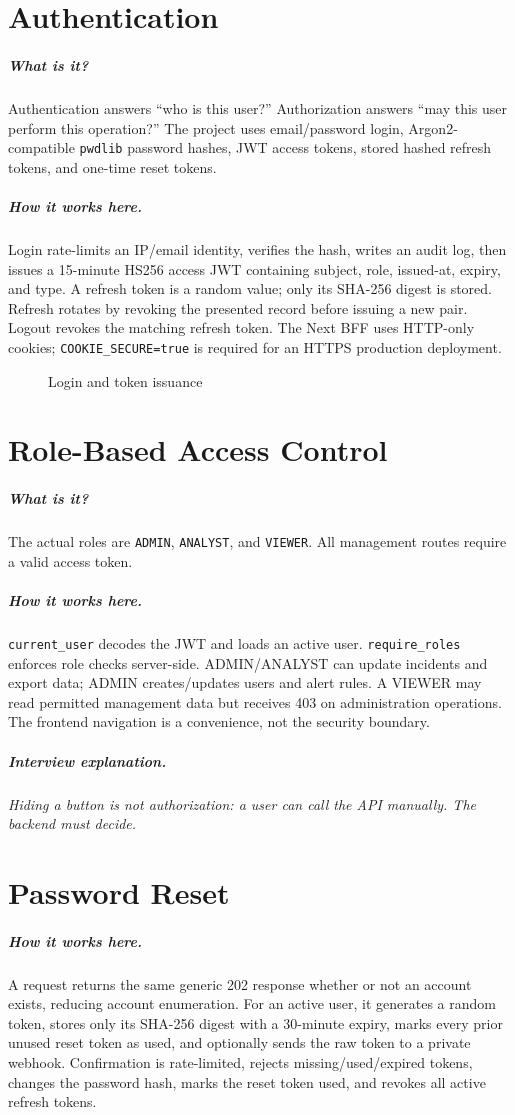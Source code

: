 \documentclass[11pt,oneside]{book}
\newcommand{\what}[1]{\paragraph{What is it?}#1}
\newcommand{\how}[1]{\paragraph{How it works here.}#1}
\newcommand{\interview}[1]{\paragraph{Interview explanation.}\emph{#1}}
\begin{document}
\chapter{Authentication}
\what{Authentication answers ``who is this user?'' Authorization answers ``may this user perform this operation?'' The project uses email/password login, Argon2-compatible \texttt{pwdlib} password hashes, JWT access tokens, stored hashed refresh tokens, and one-time reset tokens.}
\how{Login rate-limits an IP/email identity, verifies the hash, writes an audit log, then issues a 15-minute HS256 access JWT containing subject, role, issued-at, expiry, and type. A refresh token is a random value; only its SHA-256 digest is stored. Refresh rotates by revoking the presented record before issuing a new pair. Logout revokes the matching refresh token. The Next BFF uses HTTP-only cookies; \texttt{COOKIE\_SECURE=true} is required for an HTTPS production deployment.}
\begin{figure}[h]\centering{}\caption{Login and token issuance}\end{figure}

\chapter{Role-Based Access Control}
\what{The actual roles are \texttt{ADMIN}, \texttt{ANALYST}, and \texttt{VIEWER}. All management routes require a valid access token.}\how{\texttt{current\_user} decodes the JWT and loads an active user. \texttt{require\_roles} enforces role checks server-side. ADMIN/ANALYST can update incidents and export data; ADMIN creates/updates users and alert rules. A VIEWER may read permitted management data but receives 403 on administration operations. The frontend navigation is a convenience, not the security boundary.}
\interview{Hiding a button is not authorization: a user can call the API manually. The backend must decide.}

\chapter{Password Reset}
\how{A request returns the same generic 202 response whether or not an account exists, reducing account enumeration. For an active user, it generates a random token, stores only its SHA-256 digest with a 30-minute expiry, marks every prior unused reset token as used, and optionally sends the raw token to a private webhook. Confirmation is rate-limited, rejects missing/used/expired tokens, changes the password hash, marks the reset token used, and revokes all active refresh tokens.}
\end{document}
